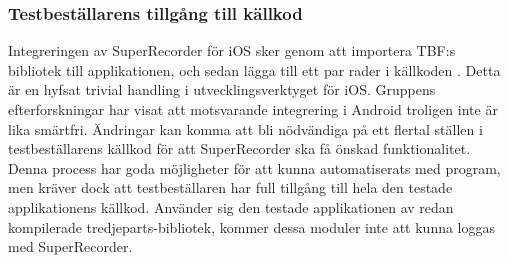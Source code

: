 \subsubsection{Testbeställarens tillgång till källkod}
Integreringen av SuperRecorder för iOS sker genom att importera TBF:s bibliotek till applikationen, och sedan lägga till ett par rader i källkoden \parencite{superrec}. Detta är en hyfsat trivial handling i utvecklingsverktyget för iOS. Gruppens efterforskningar har visat att motsvarande integrering i Android troligen inte är lika smärtfri. Ändringar kan komma att bli nödvändiga på ett flertal ställen i testbeställarens källkod för att SuperRecorder ska få önskad funktionalitet. Denna process har goda möjligheter för att kunna automatiserats med program, men kräver dock att testbeställaren har full tillgång till hela den testade applikationens källkod. Använder sig den testade applikationen av redan kompilerade tredjeparts-bibliotek, kommer dessa moduler inte att kunna loggas med SuperRecorder.
